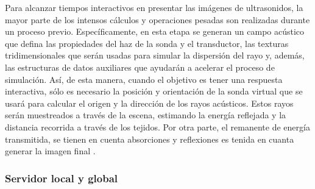Para alcanzar tiempos interactivos en presentar las imágenes de ultrasonidos, la mayor parte de los intensos cálculos y operaciones pesadas son realizadas durante un proceso previo. Específicamente, en esta etapa se generan un campo acústico que defina las propiedades del haz de la sonda y el transductor, las texturas tridimensionales que serán usadas para simular la dispersión del rayo y, además, las estructuras de datos auxiliares que ayudarán a acelerar el proceso de simulación.
Así, de esta manera, cuando el objetivo es tener una respuesta interactiva, sólo es necesario la posición y orientación de la sonda virtual que se usará para calcular el origen y la dirección de los rayos acústicos. Estos rayos serán muestreados a través de la escena, estimando la energía reflejada y la distancia recorrida a través de los tejidos. Por otra parte, el remanente de energía transmitida, se tienen en cuenta absorciones y reflexiones es tenida en cuanta generar la imagen final .











\subsubsection{Servidor local y global}

